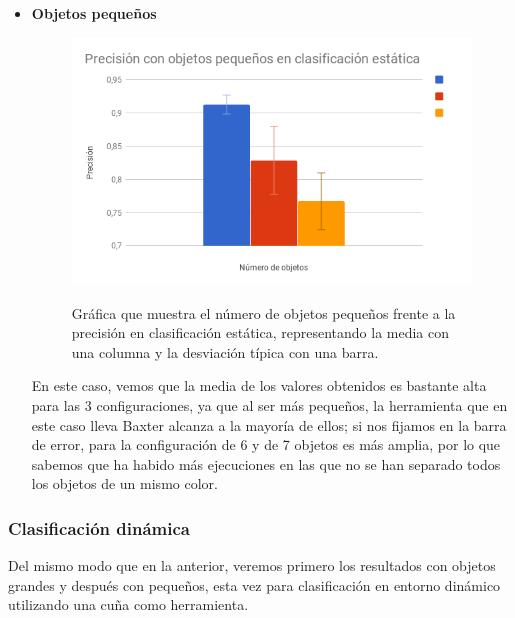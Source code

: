 \begin{itemize}
	\item \textbf{Objetos pequeños}
	\begin{figure}[H]
		\centering %
		\label{cd:ep}
		\includegraphics[scale=0.55]{imagenes/errbox_ep.png}
		\caption{Gráfica que muestra el número de objetos pequeños frente a la precisión en clasificación estática, representando la media con una columna y la desviación típica con una barra.}
	\end{figure}
	
	\noindent En este caso, vemos que la media de los valores obtenidos es bastante alta para las 3 configuraciones, ya que al ser más pequeños, la herramienta que en este caso lleva Baxter alcanza a la mayoría de ellos; si nos fijamos en la barra de error, para la configuración de 6 y de 7 objetos es más amplia, por lo que sabemos que ha habido más ejecuciones en las que no se han separado todos los objetos de un mismo color. \\
	
\end{itemize}

\subsubsection{Clasificación dinámica}
\noindent Del mismo modo que en la anterior, veremos primero los resultados con objetos grandes y después con pequeños, esta vez para clasificación en entorno dinámico utilizando una cuña como herramienta. \\

